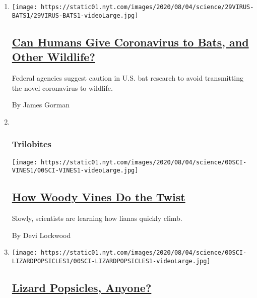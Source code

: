 \begin{enumerate}
\def\labelenumi{\arabic{enumi}.}
\item
  \texttt{[image: https://static01.nyt.com/images/2020/08/04/science/29VIRUS-BATS1/29VIRUS-BATS1-videoLarge.jpg]}

  \hypertarget{can-humans-give-coronavirus-to-bats-and-other-wildlife}{%
  \subsection{\texorpdfstring{\href{/2020/08/01/science/Covid-bats.html}{Can
  Humans Give Coronavirus to Bats, and Other
  Wildlife?}}{Can Humans Give Coronavirus to Bats, and Other Wildlife?}}\label{can-humans-give-coronavirus-to-bats-and-other-wildlife}}

  Federal agencies suggest caution in U.S. bat research to avoid
  transmitting the novel coronavirus to wildlife.

  By James Gorman
\item ~
  \hypertarget{trilobites-1}{%
  \subsubsection{Trilobites}\label{trilobites-1}}

  \texttt{[image: https://static01.nyt.com/images/2020/08/04/science/00SCI-VINES1/00SCI-VINES1-videoLarge.jpg]}

  \hypertarget{how-woody-vines-do-the-twist}{%
  \subsection{\texorpdfstring{\href{/2020/08/01/science/vines-lianas-panama.html}{How
  Woody Vines Do the
  Twist}}{How Woody Vines Do the Twist}}\label{how-woody-vines-do-the-twist}}

  Slowly, scientists are learning how lianas quickly climb.

  By Devi Lockwood
\item
  \texttt{[image: https://static01.nyt.com/images/2020/08/04/science/00SCI-LIZARDPOPSICLES1/00SCI-LIZARDPOPSICLES1-videoLarge.jpg]}

  \hypertarget{lizard-popsicles-anyone}{%
  \subsection{\texorpdfstring{\href{/2020/07/31/science/lizards-liolaemus-argentina.html}{Lizard
  Popsicles,
  Anyone?}}{Lizard Popsicles, Anyone?}}\label{lizard-popsicles-anyone}}


\end{enumerate}
